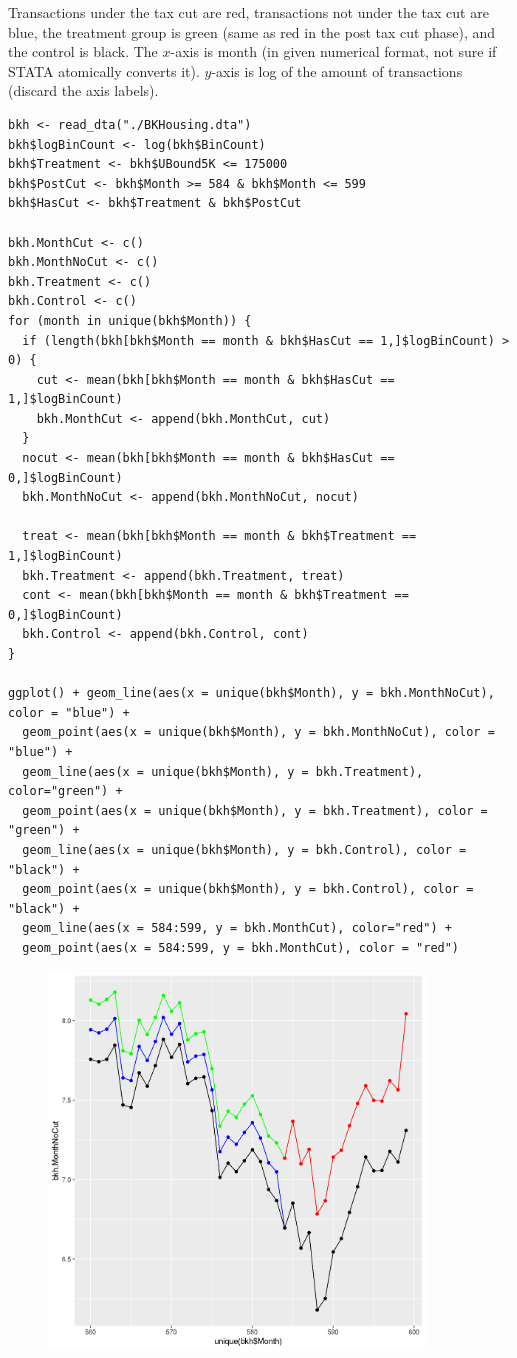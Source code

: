 \documentclass[12pt,letterpaper]{article}
\theoremstyle{definition}
\begin{document}
Transactions under the tax cut are red, transactions not under the tax cut are blue, the treatment group is green (same as red in the post tax cut phase), and the control is black. The $x$-axis is month (in given numerical format, not sure if STATA atomically converts it). $y$-axis is log of the amount of transactions (discard the axis labels).
\begin{Verbatim}[fontsize=\small]
bkh <- read_dta("./BKHousing.dta")
bkh$logBinCount <- log(bkh$BinCount)
bkh$Treatment <- bkh$UBound5K <= 175000
bkh$PostCut <- bkh$Month >= 584 & bkh$Month <= 599
bkh$HasCut <- bkh$Treatment & bkh$PostCut

bkh.MonthCut <- c()
bkh.MonthNoCut <- c()
bkh.Treatment <- c()
bkh.Control <- c()
for (month in unique(bkh$Month)) {
  if (length(bkh[bkh$Month == month & bkh$HasCut == 1,]$logBinCount) > 0) {
    cut <- mean(bkh[bkh$Month == month & bkh$HasCut == 1,]$logBinCount)
    bkh.MonthCut <- append(bkh.MonthCut, cut)
  }
  nocut <- mean(bkh[bkh$Month == month & bkh$HasCut == 0,]$logBinCount)
  bkh.MonthNoCut <- append(bkh.MonthNoCut, nocut)

  treat <- mean(bkh[bkh$Month == month & bkh$Treatment == 1,]$logBinCount)
  bkh.Treatment <- append(bkh.Treatment, treat)
  cont <- mean(bkh[bkh$Month == month & bkh$Treatment == 0,]$logBinCount)
  bkh.Control <- append(bkh.Control, cont)
}

ggplot() + geom_line(aes(x = unique(bkh$Month), y = bkh.MonthNoCut), color = "blue") +
  geom_point(aes(x = unique(bkh$Month), y = bkh.MonthNoCut), color = "blue") +
  geom_line(aes(x = unique(bkh$Month), y = bkh.Treatment), color="green") +
  geom_point(aes(x = unique(bkh$Month), y = bkh.Treatment), color = "green") +
  geom_line(aes(x = unique(bkh$Month), y = bkh.Control), color = "black") +
  geom_point(aes(x = unique(bkh$Month), y = bkh.Control), color = "black") +
  geom_line(aes(x = 584:599, y = bkh.MonthCut), color="red") +
  geom_point(aes(x = 584:599, y = bkh.MonthCut), color = "red")
\end{Verbatim}

\begin{figure}[H]
  \begin{center}
    \includegraphics[width=10cm]{2a.png}
  \end{center}
\end{figure}
\end{document}
